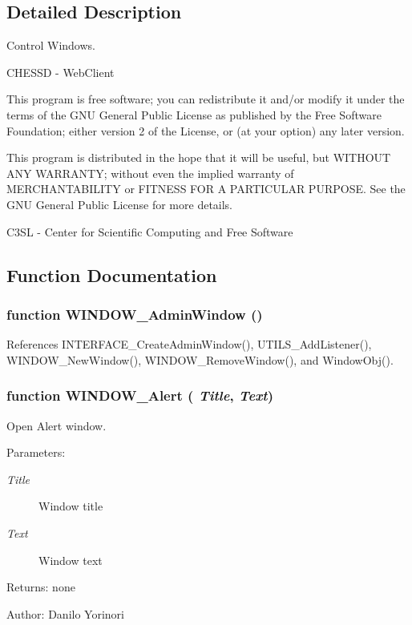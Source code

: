\subsection{Detailed Description}
Control Windows. 

CHESSD - WebClient

This program is free software; you can redistribute it and/or modify it under the terms of the GNU General Public License as published by the Free Software Foundation; either version 2 of the License, or (at your option) any later version.

This program is distributed in the hope that it will be useful, but WITHOUT ANY WARRANTY; without even the implied warranty of MERCHANTABILITY or FITNESS FOR A PARTICULAR PURPOSE. See the GNU General Public License for more details.

C3SL - Center for Scientific Computing and Free Software 

\subsection{Function Documentation}
\subsubsection[WINDOW\_\-AdminWindow]{\setlength{\rightskip}{0pt plus 5cm}function WINDOW\_\-AdminWindow ()}\label{window_2window_8js_0df491f1c2c48d7cbd65a689e8c4909d}




References INTERFACE\_\-CreateAdminWindow(), UTILS\_\-AddListener(), WINDOW\_\-NewWindow(), WINDOW\_\-RemoveWindow(), and WindowObj().
\subsubsection[WINDOW\_\-Alert]{\setlength{\rightskip}{0pt plus 5cm}function WINDOW\_\-Alert ( {\em Title}, \/   {\em Text})}\label{window_2window_8js_a1b10eccd2c596a7a41b95bc3a55c851}


Open Alert window. 

\begin{Desc}
\item[Parameters:]
\begin{description}
\item[{\em Title}]Window title \item[{\em Text}]Window text \end{description}
\end{Desc}
\begin{Desc}
\item[Returns:]none \end{Desc}
\begin{Desc}
\item[Author:]Danilo Yorinori \end{Desc}



